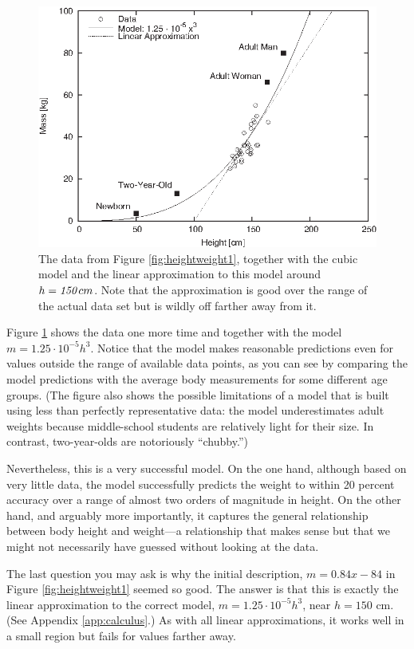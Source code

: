 \begin{figure}
  \centerline{\includegraphics{img/heightweight3}}
  \caption{The data from Figure \ref{fig:heightweight1}, together with
    the cubic model and the linear approximation to this model around
    ${h}=\hbox{\em 150}\, { cm}$. Note that the approximation is good over the
    range of the actual data set but is wildly off farther away from
    it.}
  \label{fig:heightweight3}
\end{figure}

Figure \ref{fig:heightweight3} shows the data one more time and
together with the model $m = 1.25 \cdot 10^{-5} h^3$. Notice that the
model makes reasonable predictions even for values outside the range
of available data points, as you can see by comparing the model
predictions with the average body measurements for some different age
groups. (The figure also shows the possible limitations of a model
that is built using less than perfectly representative data: the model
underestimates adult weights because middle-school students are
relatively light for their size. In contrast, two-year-olds are
notoriously ``chubby.'')

Nevertheless, this is a very successful model. On the one hand,
although based on very little data, the model successfully predicts
the weight to within 20 percent accuracy over a range of almost two
orders of magnitude in height. On the other hand, and arguably more
importantly, it captures the general relationship between body height
and weight---a relationship that makes sense but that we might not
necessarily have guessed without looking at the data.

The last question you may ask is why the initial description, $m =
0.84 x - 84$ in Figure \ref{fig:heightweight1} seemed so good. The
answer is that this is exactly the linear approximation to the correct
model, $m = 1.25 \cdot 10^{-5} h^3$, near $h = 150 \text{ cm}$. (See
Appendix \ref{app:calculus}.)  As with all linear approximations, it
works well in a small region but fails for values farther away.


